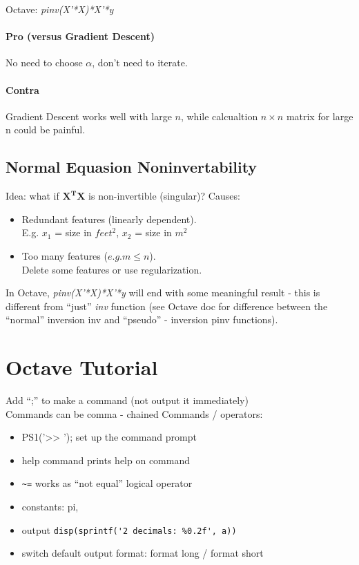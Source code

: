 \documentclass{scrartcl}
\begin{document}
Octave: \emph{ pinv(X'*X)*X'*y }

\paragraph {Pro (versus Gradient Descent)} No need to choose $\alpha$,
don't need to iterate.

\paragraph {Contra} Gradient Descent works well with large $n$, while
calcualtion $n \times n$ matrix for large n could be painful.

\subsection {Normal Equasion Noninvertability}
Idea: what if $\mathbf{X^TX}$ is non-invertible (singular)?
Causes:\begin{itemize}
\item Redundant features (linearly dependent). \\
  E.g. $x_1$ = size in $feet^2$, $x_2$ = size in $m^2$
\item Too many features ($e.g. m \leq n$). \\
  Delete some features or use regularization.

\end{itemize}

In Octave, \emph{pinv(X'*X)*X'*y} will end with some meaningful result
- this is different from ``just'' \emph{inv} function (see Octave doc
for difference between the ``normal'' inversion inv and ``pseudo'' -
inversion pinv functions).

\section {Octave Tutorial}
\label {Chapter 5}
Add ``;'' to make a command (not output it immediately)\\
Commands can be comma - chained Commands / operators:\begin{itemize}
\item {PS1('>> ');} set up the command prompt
\item {help command} prints help on command
\item {\verb!~=!} works as ``not equal'' logical operator
\item {constants}: pi,
\item {output} \verb!disp(sprintf('2 decimals: %0.2f', a))!
\item {switch default output format}: format long / format short
\end{itemize}
\end{document}
